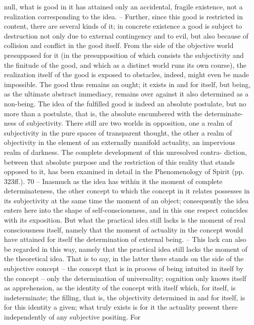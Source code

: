 null, what is good in it has attained only an accidental, fragile existence,
not a realization corresponding to the idea. – Further, since this good is
restricted in content, there are several kinds of it; in concrete existence a
good is subject to destruction not only due to external contingency and
to evil, but also because of collision and conflict in the good itself. From
the side of the objective world presupposed for it (in the presupposition
of which consists the subjectivity and the finitude of the good, and which
as a distinct world runs its own course), the realization itself of the good
is exposed to obstacles, indeed, might even be made impossible. The good
thus remains an ought; it exists in and for itself, but being, as the ultimate
abstract immediacy, remains over against it also determined as a non-being.
The idea of the fulfilled good is indeed an absolute postulate, but no more
than a postulate, that is, the absolute encumbered with the determinate-
ness of subjectivity. There still are two worlds in opposition, one a realm of
subjectivity in the pure spaces of transparent thought, the other a realm of
objectivity in the element of an externally manifold actuality, an impervious
realm of darkness. The complete development of this unresolved contra-
diction, between that absolute purpose and the restriction of this reality that
stands opposed to it, has been examined in detail in the Phenomenology
of Spirit (pp. 323ff.). 70 – Inasmuch as the idea has within it the moment
of complete determinateness, the other concept to which the concept in
it relates possesses in its subjectivity at the same time the moment of an
object; consequently the idea enters here into the shape of self-consciousness,
and in this one respect coincides with its exposition.
But what the practical idea still lacks is the moment of real consciousness
itself, namely that the moment of actuality in the concept would have
attained for itself the determination of external being. – This lack can also
be regarded in this way, namely that the practical idea still lacks the moment
of the theoretical idea. That is to say, in the latter there stands on the side
of the subjective concept – the concept that is in process of being intuited
in itself by the concept – only the determination of universality; cognition
only knows itself as apprehension, as the identity of the concept with
itself which, for itself, is indeterminate; the filling, that is, the objectivity
determined in and for itself, is for this identity a given; what truly exists is for
it the actuality present there independently of any subjective positing. For
